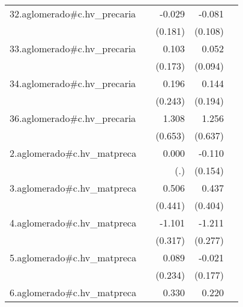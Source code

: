 {\begin{longtable}{l*{4}{D{.}{.}{-1}}}
\addlinespace
32.aglomerado#c.hv\_precaria&                     &      -0.029         &      -0.081         &                     \\
            &                     &     (0.181)         &     (0.108)         &                     \\
\addlinespace
33.aglomerado#c.hv\_precaria&                     &       0.103         &       0.052         &                     \\
            &                     &     (0.173)         &     (0.094)         &                     \\
\addlinespace
34.aglomerado#c.hv\_precaria&                     &       0.196         &       0.144         &                     \\
            &                     &     (0.243)         &     (0.194)         &                     \\
\addlinespace
36.aglomerado#c.hv\_precaria&                     &       1.308\sym{*}  &       1.256\sym{*}  &                     \\
            &                     &     (0.653)         &     (0.637)         &                     \\
\addlinespace
2.aglomerado#c.hv\_matpreca&                     &       0.000         &      -0.110         &                     \\
            &                     &         (.)         &     (0.154)         &                     \\
\addlinespace
3.aglomerado#c.hv\_matpreca&                     &       0.506         &       0.437         &                     \\
            &                     &     (0.441)         &     (0.404)         &                     \\
\addlinespace
4.aglomerado#c.hv\_matpreca&                     &      -1.101\sym{***}&      -1.211\sym{***}&                     \\
            &                     &     (0.317)         &     (0.277)         &                     \\
\addlinespace
5.aglomerado#c.hv\_matpreca&                     &       0.089         &      -0.021         &                     \\
            &                     &     (0.234)         &     (0.177)         &                     \\
\addlinespace
6.aglomerado#c.hv\_matpreca&                     &       0.330         &       0.220         &                     \\

\end{longtable}}
